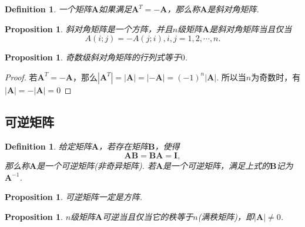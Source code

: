 \documentclass{article}
\newtheorem{proposition}[theorem]{Proposition}
\newtheorem{definition}[theorem]{Definition}
\newcommand{\mbf}[1]{\bm{#1}}
\begin{document}
\begin{definition}
\rm 一个矩阵$\mbf{A}$如果满足$\mbf{A}^T = -\mbf{A}$，那么称$\mbf{A}$是斜对角矩阵.
\end{definition}

\begin{proposition}
\rm 斜对角矩阵是一个方阵，并且$n$级矩阵$\mbf{A}$是斜对角矩阵当且仅当
$$
A(i;j) = -A(j;i), i,j = 1,2,\cdots,n.
$$
\end{proposition}

\begin{proposition}
\rm 奇数级斜对角矩阵的行列式等于$0$.
\end{proposition}

\begin{proof}
若$\mbf{A}^T = - \mbf{A}$，那么$|\mbf{A}^T| = |\mbf{A}| = |-\mbf{A}| = (-1)^n |\mbf{A}|$. 所以当$n$为奇数时，有$|\mbf{A}| = -|\mbf{A}| = 0$
\end{proof}

\subsection{可逆矩阵}

\begin{definition}
\rm 给定矩阵$\mbf{A}$，若存在矩阵$\mbf{B}$，使得
$$
\mbf{A}\mbf{B} = \mbf{B}\mbf{A} = \mbf{I},
$$
那么称$\mbf{A}$是一个可逆矩阵(非奇异矩阵). 若$\mbf{A}$是一个可逆矩阵，满足上式的$\mbf{B}$记为$\mbf{A}^{-1}$.
\end{definition}

\begin{proposition}
\rm 可逆矩阵一定是方阵.
\end{proposition}

\begin{proposition}\label{invertible: cond}
\rm $n$级矩阵$\mbf{A}$可逆当且仅当它的秩等于$n$(满秩矩阵)，即$|\mbf{A}| \neq 0$.
\end{proposition}
\end{document}
